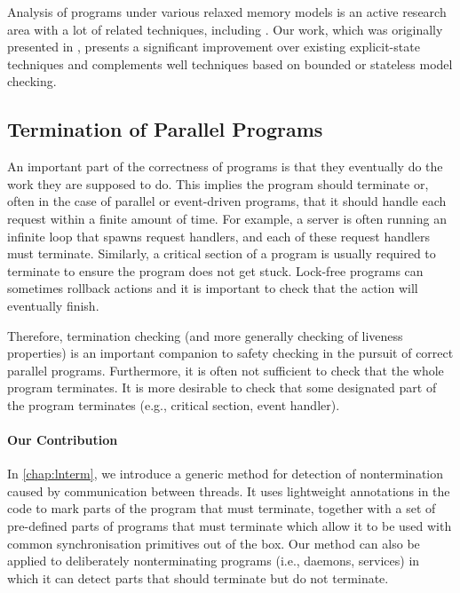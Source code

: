 Analysis of programs under various relaxed memory models is an active research area with a lot of related techniques, including .
Our work, which was originally presented in , presents a significant improvement over existing explicit-state techniques and complements well techniques based on bounded or stateless model checking.


\subsection{Termination of Parallel Programs}

An important part of the correctness of programs is that they eventually do the work they are supposed to do.
This implies the program should terminate or, often in the case of parallel or event-driven programs, that it should handle each request within a finite amount of time.
For example, a server is often running an infinite loop that spawns request handlers, and each of these request handlers must terminate.
Similarly, a critical section of a program is usually required to terminate to ensure the program does not get stuck.
Lock-free programs can sometimes rollback actions and it is important to check that the action will eventually finish.

Therefore, termination checking (and more generally checking of liveness properties) is an important companion to safety checking in the pursuit of correct parallel programs.
Furthermore, it is often not sufficient to check that the whole program terminates.
It is more desirable to check that some designated part of the program terminates (e.g., critical section, event handler).

\paragraph{Our Contribution}
In \autoref{chap:lnterm}, we introduce a generic method for
detection of nontermination caused by communication between threads.
It uses lightweight annotations in the code to mark parts of the program that
must terminate, together with a set of pre-defined parts of programs that must
terminate which allow it to be used with common synchronisation primitives out
of the box.
Our method can also be applied to deliberately nonterminating programs (i.e.,
daemons, services) in which it can detect parts that should terminate but do
not terminate.

